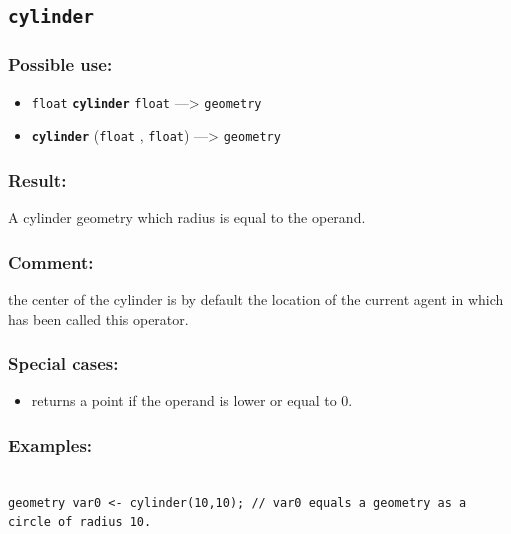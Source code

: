 \documentclass[]{book}
\providecommand{\tightlist}{%
  \setlength{\itemsep}{0pt}\setlength{\parskip}{0pt}}
\theoremstyle{definition}
\theoremstyle{definition}
\theoremstyle{definition}
\theoremstyle{remark}
\begin{document}
\subsection{\texorpdfstring{\texttt{cylinder}}{cylinder}}\label{cylinder}

\subsubsection{Possible use:}\label{possible-use-123}

\begin{itemize}
\tightlist
\item
  \texttt{float} \textbf{\texttt{cylinder}} \texttt{float}
  ---\textgreater{} \texttt{geometry}
\item
  \textbf{\texttt{cylinder}} (\texttt{float} , \texttt{float})
  ---\textgreater{} \texttt{geometry}
\end{itemize}

\subsubsection{Result:}\label{result-119}

A cylinder geometry which radius is equal to the operand.

\subsubsection{Comment:}\label{comment-29}

the center of the cylinder is by default the location of the current
agent in which has been called this operator.

\subsubsection{Special cases:}\label{special-cases-48}

\begin{itemize}
\tightlist
\item
  returns a point if the operand is lower or equal to 0.
\end{itemize}

\subsubsection{Examples:}\label{examples-93}

\begin{verbatim}
 
geometry var0 <- cylinder(10,10); // var0 equals a geometry as a circle of radius 10.
\end{verbatim}
\end{document}
